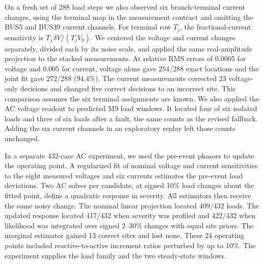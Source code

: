 On a fresh set of 288 load steps we also observed six branch-terminal
current changes, using the terminal map in the measurement contract and
omitting the BUS5 and BUS39 current channels. For terminal row $T_j$,
the fractional-current sensitivity is
$T_j\,\delta V/(T_j V_0)$. We centered the voltage and current changes
separately, divided each by its noise scale, and applied the same
real-amplitude projection to the stacked measurements. At relative RMS
errors of 0.0005 for voltage and 0.005 for current, voltage alone gave
254/288 exact locations and the joint fit gave 272/288 (94.4\%).
The current measurements corrected 23 voltage-only decisions and
changed five correct decisions to an incorrect site. This comparison
assumes the six terminal assignments are known.
We also applied the AC voltage readout to predicted M9 load windows.
It located four of six isolated loads and three of six loads after a
fault, the same counts as the revised fallback. Adding the six current
channels in an exploratory replay left those counts unchanged.

In a separate 432-case AC experiment, we used the pre-event phasors
to update the operating point. A regularized fit of nominal voltage
and current sensitivities to the eight measured voltages and six
currents estimates the pre-event load deviations. Two AC solves per
candidate, at signed 10\% load changes about the fitted point, define
a quadratic response in severity. All estimators then receive the same
noisy change. The nominal linear projection located 409/432 loads.
The updated response located 417/432 when severity was profiled and
422/432 when likelihood was integrated over signed 2--30\% changes
with equal site priors. The marginal estimator gained 13 correct sites
and lost none. These 24 operating points included reactive-to-active
increment ratios perturbed by up to 10\%. The experiment supplies the
load family and the two steady-state windows.
